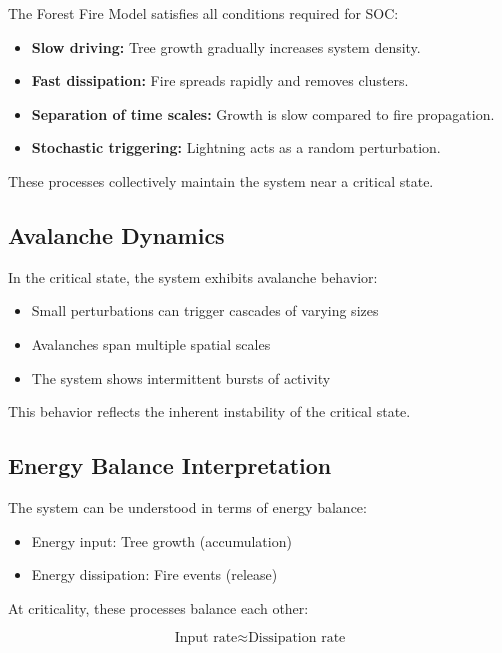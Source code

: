 \documentclass[12pt,a4paper]{article}
\begin{document}
The Forest Fire Model satisfies all conditions required for SOC:

\begin{itemize}
\item \textbf{Slow driving:} Tree growth gradually increases system density.
\item \textbf{Fast dissipation:} Fire spreads rapidly and removes clusters.
\item \textbf{Separation of time scales:} Growth is slow compared to fire propagation.
\item \textbf{Stochastic triggering:} Lightning acts as a random perturbation.
\end{itemize}

These processes collectively maintain the system near a critical state.

\subsection{Avalanche Dynamics}

In the critical state, the system exhibits avalanche behavior:

\begin{itemize}
\item Small perturbations can trigger cascades of varying sizes
\item Avalanches span multiple spatial scales
\item The system shows intermittent bursts of activity
\end{itemize}

This behavior reflects the inherent instability of the critical state.

\subsection{Energy Balance Interpretation}

The system can be understood in terms of energy balance:

\begin{itemize}
\item Energy input: Tree growth (accumulation)
\item Energy dissipation: Fire events (release)
\end{itemize}

At criticality, these processes balance each other:

\begin{equation}
\text{Input rate} \approx \text{Dissipation rate}
\end{equation}
\end{document}
